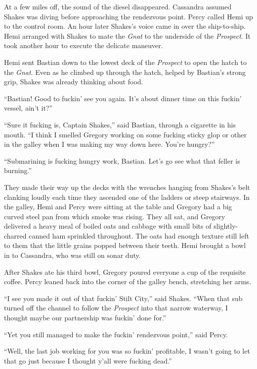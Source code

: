 \documentclass[
]{scrbook}
\begin{document}
At a few miles off, the sound of the diesel disappeared. Cassandra
assumed Shakes was diving before approaching the rendezvous point. Percy
called Hemi up to the control room. An hour later Shakes's voice came in
over the ship-to-ship. Hemi arranged with Shakes to mate the \emph{Gnat}
to the underside of the \emph{Prospect}. It took another hour to execute
the delicate maneuver.

Hemi sent Bastian down to the lowest deck of the \emph{Prospect} to open
the hatch to the \emph{Gnat}. Even as he climbed up through the hatch,
helped by Bastian's strong grip, Shakes was already thinking about food.

``Bastian! Good to fuckin' see you again. It's about dinner time on this
fuckin' vessel, ain't it?''

``Sure it fucking is, Captain Shakes,'' said Bastian, through a
cigarette in his mouth. ``I think I smelled Gregory working on some
fucking sticky glop or other in the galley when I was making my way down
here. You're hungry?''

``Submarining is fucking hungry work, Bastian. Let's go see what that
feller is burning.''

They made their way up the decks with the wrenches hanging from Shakes's
belt clanking loudly each time they ascended one of the ladders or steep
stairways. In the galley, Hemi and Percy were sitting at the table and
Gregory had a big curved steel pan from which smoke was rising. They all
sat, and Gregory delivered a heavy meal of boiled oats and cabbage with
small bits of slightly-charred canned ham sprinkled throughout. The oats
had enough texture still left to them that the little grains popped
between their teeth. Hemi brought a bowl in to Cassandra, who was still
on sonar duty.

After Shakes ate his third bowl, Gregory poured everyone a cup of the
requisite coffee. Percy leaned back into the corner of the galley bench,
stretching her arms.

``I see you made it out of that fuckin' Stilt City,'' said Shakes.
``When that sub turned off the channel to follow the \emph{Prospect}
into that narrow waterway, I thought maybe our partnership was fuckin'
done for.''

``Yet you still managed to make the fuckin' rendezvous point,'' said
Percy.

``Well, the last job working for you was so fuckin' profitable, I wasn't
going to let that go just because I thought y'all were fucking dead.''
\end{document}
